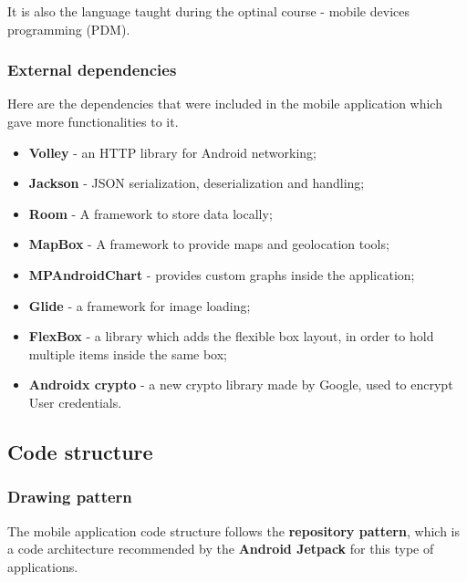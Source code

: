 It is also the language taught during the optinal course - mobile devices programming (PDM).\\

\subsubsection{External dependencies}

Here are the dependencies that were included in the mobile application which gave more functionalities to it.

\begin{itemize}
    \item \textbf{Volley} - an HTTP library for Android networking;
    \item \textbf{Jackson} - JSON serialization, deserialization and handling;
    \item \textbf{Room} - A framework to store data locally;
    \item \textbf{MapBox} - A framework to provide maps and geolocation tools;
    \item \textbf{MPAndroidChart} - provides custom graphs inside the application;
    \item \textbf{Glide} - a framework for image loading;
    \item \textbf{FlexBox} - a library which adds the flexible box layout, in order to hold multiple items
    inside the same box;
    \item \textbf{Androidx crypto} - a new crypto library made by Google, used to encrypt User credentials.
\end{itemize}

\subsection{Code structure}

\subsubsection{Drawing pattern}

The mobile application code structure follows the \textbf{repository pattern}, which is a code architecture recommended by the \textbf{Android Jetpack}\cite{jetpack} for this type of applications.\\

